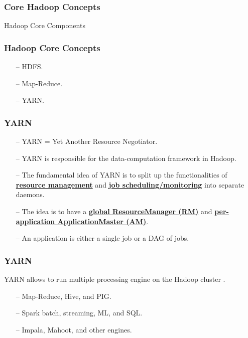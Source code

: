 \begin{frame}[c]{ }
	\frametitle{Core Hadoop Concepts }
	\centering     
	
	\textcolor{offgreen}{ \large Hadoop Core Components}
\end{frame}
\begin{frame}[c]{ }
	\frametitle{Hadoop Core Concepts }
	
	
	\begin{itemize}  [<+->]
		\item [--] HDFS.
		\item [--] Map-Reduce.
		\item [--] YARN.
		
	\end{itemize}
\end{frame}
\begin{frame}[c]{ }
	\frametitle{YARN }
	
	\begin{itemize}  [<+->]
		\item [--] YARN =  Yet Another Resource Negotiator.
		\item [--] YARN is responsible for the data-computation framework in Hadoop.
		\item [--] The fundamental idea of YARN is to split up the functionalities of 	\textcolor{offyellow}{ \underline{ \textbf{resource management}}} and 	\textcolor{offyellow}{ \underline{ \textbf{job scheduling/monitoring}}} into separate daemons.
		\item [--] The idea is to have a \textcolor{offyellow}{ \underline{ \textbf{global ResourceManager (RM)}}} and 	\textcolor{offyellow}{ \underline{ \textbf{per-application ApplicationMaster (AM)}}}. 
		\item [--] An application is either a single job or a DAG of jobs.		
	\end{itemize}
\end{frame}
\begin{frame}[c]{ }
	\frametitle{YARN }
	YARN allows to run multiple processing engine on the Hadoop cluster .
	{\footnotesize
	\begin{itemize}  [<+->]
		\item [--] Map-Reduce, Hive, and PIG.
		\item [--] Spark batch, streaming, ML, and SQL.
		\item [--] Impala, Mahoot, and other engines.
	\end{itemize}
	}
\end{frame}
